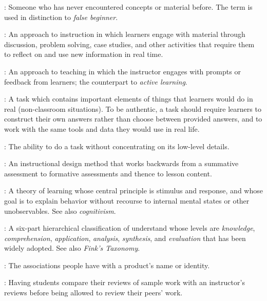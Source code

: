 
\begin{description}

: Someone who has never
encountered concepts or material before. The term is used in distinction to
\emph{false beginner}.

: An approach to instruction in which
learners engage with material through discussion, problem solving, case studies,
and other activities that require them to reflect on and use new information in
real time.

: An approach to teaching in which the
instructor engages with prompts or feedback from learners; the counterpart to
\emph{active learning}.

: A task which contains important
elements of things that learners would do in real (non-classroom situations). To
be authentic, a task should require learners to construct their own answers
rather than choose between provided answers, and to work with the same tools and
data they would use in real life.

: The ability to do a task without
concentrating on its low-level details.

: An instructional design method that
works backwards from a summative assessment to formative assessments and thence
to lesson content.

: A theory of learning whose central principle
is stimulus and response, and whose goal is to explain behavior without recourse
to internal mental states or other unobservables. See also \emph{cognitivism}.

: A six-part hierarchical
classification of understand whose levels are \emph{knowledge},
\emph{comprehension}, \emph{application}, \emph{analysis}, \emph{synthesis}, and
\emph{evaluation} that has been widely adopted. See also \emph{Fink's Taxonomy}.

: The associations people have with a product's name or
identity.

: Having students
compare their reviews of sample work with an instructor's reviews before being
allowed to review their peers' work.


\end{description}
